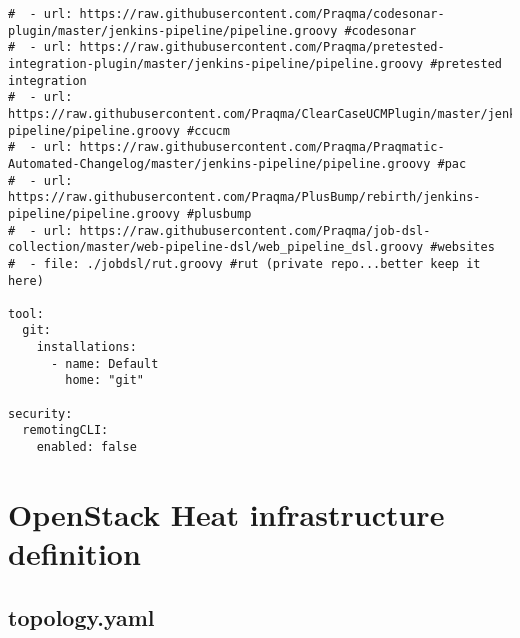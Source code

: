 \begin{verbatim}
#  - url: https://raw.githubusercontent.com/Praqma/codesonar-plugin/master/jenkins-pipeline/pipeline.groovy #codesonar
#  - url: https://raw.githubusercontent.com/Praqma/pretested-integration-plugin/master/jenkins-pipeline/pipeline.groovy #pretested integration
#  - url: https://raw.githubusercontent.com/Praqma/ClearCaseUCMPlugin/master/jenkins-pipeline/pipeline.groovy #ccucm
#  - url: https://raw.githubusercontent.com/Praqma/Praqmatic-Automated-Changelog/master/jenkins-pipeline/pipeline.groovy #pac
#  - url: https://raw.githubusercontent.com/Praqma/PlusBump/rebirth/jenkins-pipeline/pipeline.groovy #plusbump
#  - url: https://raw.githubusercontent.com/Praqma/job-dsl-collection/master/web-pipeline-dsl/web_pipeline_dsl.groovy #websites
#  - file: ./jobdsl/rut.groovy #rut (private repo...better keep it here)

tool:
  git:
    installations:
      - name: Default
        home: "git"

security:
  remotingCLI:
    enabled: false
\end{verbatim}

\section{OpenStack Heat infrastructure definition} \label{openstackheatdef}

\subsection{topology.yaml}

